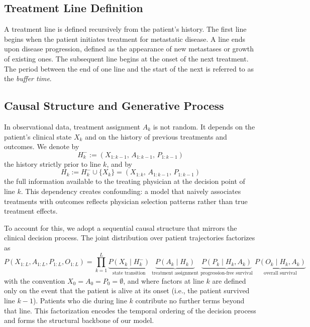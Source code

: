 \documentclass[a4paper,10pt]{article}
\begin{document}
\subsection{Treatment Line Definition}

A treatment line is defined recursively from the patient's history. The first line begins when the patient initiates treatment for metastatic disease. A line ends upon disease progression, defined as the appearance of new metastases or growth of existing ones. The subsequent line begins at the onset of the next treatment. The period between the end of one line and the start of the next is referred to as the \textit{buffer time}.



\subsection{Causal Structure and Generative Process}

In observational data, treatment assignment $A_k$ is not random. It depends on the patient's clinical state $X_k$ and on the history of previous treatments and outcomes. We denote by
\begin{equation}
    H_k^- := (X_{1:k-1},\, A_{1:k-1},\, P_{1:k-1})
\end{equation}
the history strictly prior to line $k$, and by
\begin{equation}
    H_k := H_k^- \cup \{X_k\} = (X_{1:k},\, A_{1:k-1},\, P_{1:k-1})
\end{equation}
the full information available to the treating physician at the decision point of line $k$. This dependency creates confounding: a model that naively associates treatments with outcomes reflects physician selection patterns rather than true treatment effects.

To account for this, we adopt a sequential causal structure that mirrors the clinical decision process. The joint distribution over patient trajectories factorizes as
\begin{equation}
    P(X_{1:L}, A_{1:L}, P_{1:L}, O_{1:L}) 
    = \prod_{k=1}^{L} 
    \underbrace{P(X_k \mid H_k^-)}_{\text{state transition}} \;
    \underbrace{P(A_k \mid H_k)}_{\text{treatment assignment}} \;
    \underbrace{P(P_k \mid H_k, A_k)}_{\text{progression-free survival}} \;
    \underbrace{P(O_k \mid H_k, A_k)}_{\text{overall survival}}
    \label{eq:factorization}
\end{equation}
with the convention $X_0 = A_0 = P_0 = \emptyset$, and where factors at line $k$ are defined only on the event that the patient is alive at its onset (i.e., the patient survived line $k-1$). Patients who die during line $k$ contribute no further terms beyond that line. This factorization encodes the temporal ordering of the decision process and forms the structural backbone of our model. 
\end{document}
